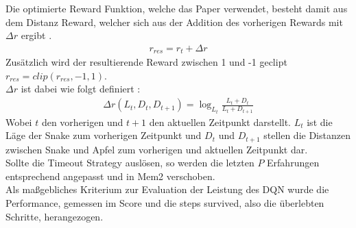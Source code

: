 Die optimierte Reward Funktion, welche das Paper verwendet, besteht damit aus dem Distanz Reward, welcher sich aus der Addition des vorherigen Rewards mit $\Delta r$ ergibt .
\begin{align}
	r_{res} = r_t + \Delta r
	\label{eq:Verwandte_Arbeiten_r}
\end{align}
Zusätzlich wird der resultierende Reward zwischen 1 und -1 geclipt $r_{res} = clip(r_{res}, -1, 1)$.\\
$\Delta r$ ist dabei wie folgt definiert :
\begin{align}
	\Delta r(L_t, D_t,D_{t+1}) = \log_{L_t}\frac{L_t + D_t}{L_t + D_{t + 1}}
	\label{eq:Verwandte_Arbeiten_Delta_r}
\end{align}
Wobei $t$ den vorherigen und $t+1$ den aktuellen Zeitpunkt darstellt. $L_t$ ist die Läge der Snake zum vorherigen Zeitpunkt und $D_t$ und $D_{t+1}$ stellen die Distanzen zwischen Snake und Apfel zum vorherigen und aktuellen Zeitpunkt dar.\\
Sollte die Timeout Strategy auslösen, so werden die letzten $P$ Erfahrungen entsprechend angepasst und in Mem2 verschoben.\\
Als maßgebliches Kriterium zur Evaluation der Leistung des DQN wurde die Performance, gemessen im Score und die steps survived, also die überlebten Schritte, herangezogen.

